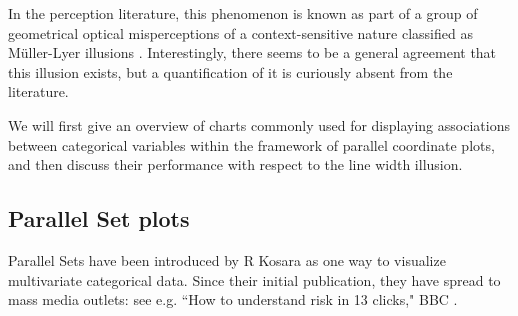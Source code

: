In the perception literature, this phenomenon is known as part of a group of geometrical optical misperceptions of a context-sensitive nature classified as M\"uller-Lyer illusions \citep{day:1991}. Interestingly, there seems to be a general agreement that this illusion exists, but a quantification of it is curiously absent from the literature. 

We will first give an overview of  charts commonly used for displaying associations between categorical variables within the framework of parallel coordinate plots, and then discuss their performance with respect to the line width illusion. %




%
%




\subsection{Parallel Set plots}


Parallel Sets have been introduced by R Kosara \citep{kosara:2006} as one way to visualize multivariate categorical data. Since their initial publication, they have spread to mass media outlets: see e.g. 
``How to understand risk in 13 clicks," BBC \citep{bbc:2009}.

